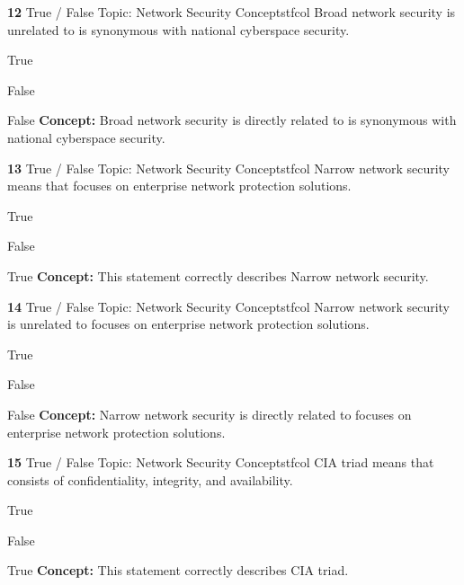\documentclass[10pt,a4paper]{article}
\begin{document}
\begin{qcard}{\color{white}\textbf{12} \hfill \small True / False \textbar{} Topic: Network Security Concepts}{tfcol}
Broad network security is unrelated to is synonymous with national cyberspace security.

\begin{qoptions}
\item True
\item False
\end{qoptions}
\begin{explainbox}{False}
\textbf{Concept:} Broad network security is directly related to is synonymous with national cyberspace security.
\end{explainbox}
\end{qcard}

\begin{qcard}{\color{white}\textbf{13} \hfill \small True / False \textbar{} Topic: Network Security Concepts}{tfcol}
Narrow network security means that focuses on enterprise network protection solutions.

\begin{qoptions}
\item True
\item False
\end{qoptions}
\begin{explainbox}{True}
\textbf{Concept:} This statement correctly describes Narrow network security.
\end{explainbox}
\end{qcard}

\begin{qcard}{\color{white}\textbf{14} \hfill \small True / False \textbar{} Topic: Network Security Concepts}{tfcol}
Narrow network security is unrelated to focuses on enterprise network protection solutions.

\begin{qoptions}
\item True
\item False
\end{qoptions}
\begin{explainbox}{False}
\textbf{Concept:} Narrow network security is directly related to focuses on enterprise network protection solutions.
\end{explainbox}
\end{qcard}

\begin{qcard}{\color{white}\textbf{15} \hfill \small True / False \textbar{} Topic: Network Security Concepts}{tfcol}
CIA triad means that consists of confidentiality, integrity, and availability.

\begin{qoptions}
\item True
\item False
\end{qoptions}
\begin{explainbox}{True}
\textbf{Concept:} This statement correctly describes CIA triad.
\end{explainbox}
\end{qcard}
\end{document}
